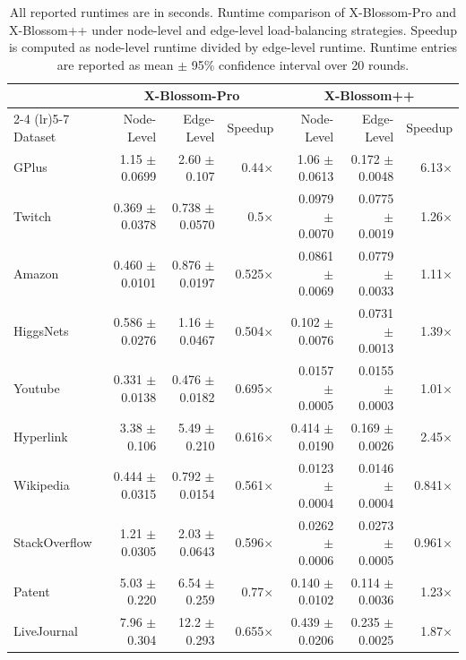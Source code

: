 \begin{table}[H]
 \scriptsize
 \centering
 \setlength{\tabcolsep}{5pt}
 \renewcommand{\arraystretch}{0.88}
 \begin{tabular}{l|rrr|rrr}
 \toprule
  & \multicolumn{3}{c|}{\textbf{X-Blossom-Pro}}
  & \multicolumn{3}{c}{\textbf{X-Blossom++}} \\
 \cmidrule(lr){2-4} \cmidrule(lr){5-7}
 Dataset &
 Node-Level &
 Edge-Level &
 Speedup &
 Node-Level &
 Edge-Level &
 Speedup \\
 \midrule
 GPlus & 1.15 {\tiny $\pm$ 0.0699} & 2.60 {\tiny $\pm$ 0.107} & 0.44$\times$ & 1.06 {\tiny $\pm$ 0.0613} & 0.172 {\tiny $\pm$ 0.0048} & 6.13$\times$ \\
 Twitch & 0.369 {\tiny $\pm$ 0.0378} & 0.738 {\tiny $\pm$ 0.0570} & 0.5$\times$ & 0.0979 {\tiny $\pm$ 0.0070} & 0.0775 {\tiny $\pm$ 0.0019} & 1.26$\times$ \\
 Amazon & 0.460 {\tiny $\pm$ 0.0101} & 0.876 {\tiny $\pm$ 0.0197} & 0.525$\times$ & 0.0861 {\tiny $\pm$ 0.0069} & 0.0779 {\tiny $\pm$ 0.0033} & 1.11$\times$ \\
 HiggsNets & 0.586 {\tiny $\pm$ 0.0276} & 1.16 {\tiny $\pm$ 0.0467} & 0.504$\times$ & 0.102 {\tiny $\pm$ 0.0076} & 0.0731 {\tiny $\pm$ 0.0013} & 1.39$\times$ \\
 Youtube & 0.331 {\tiny $\pm$ 0.0138} & 0.476 {\tiny $\pm$ 0.0182} & 0.695$\times$ & 0.0157 {\tiny $\pm$ 0.0005} & 0.0155 {\tiny $\pm$ 0.0003} & 1.01$\times$ \\
 Hyperlink & 3.38 {\tiny $\pm$ 0.106} & 5.49 {\tiny $\pm$ 0.210} & 0.616$\times$ & 0.414 {\tiny $\pm$ 0.0190} & 0.169 {\tiny $\pm$ 0.0026} & 2.45$\times$ \\
 Wikipedia & 0.444 {\tiny $\pm$ 0.0315} & 0.792 {\tiny $\pm$ 0.0154} & 0.561$\times$ & 0.0123 {\tiny $\pm$ 0.0004} & 0.0146 {\tiny $\pm$ 0.0004} & 0.841$\times$ \\
 StackOverflow & 1.21 {\tiny $\pm$ 0.0305} & 2.03 {\tiny $\pm$ 0.0643} & 0.596$\times$ & 0.0262 {\tiny $\pm$ 0.0006} & 0.0273 {\tiny $\pm$ 0.0005} & 0.961$\times$ \\
 Patent & 5.03 {\tiny $\pm$ 0.220} & 6.54 {\tiny $\pm$ 0.259} & 0.77$\times$ & 0.140 {\tiny $\pm$ 0.0102} & 0.114 {\tiny $\pm$ 0.0036} & 1.23$\times$ \\
 LiveJournal & 7.96 {\tiny $\pm$ 0.304} & 12.2 {\tiny $\pm$ 0.293} & 0.655$\times$ & 0.439 {\tiny $\pm$ 0.0206} & 0.235 {\tiny $\pm$ 0.0025} & 1.87$\times$ \\
 \bottomrule
 \end{tabular}
 \captionsetup{skip=4pt}
 \caption{
 All reported runtimes are in seconds.
 Runtime comparison of X-Blossom-Pro and X-Blossom++ under node-level and edge-level load-balancing strategies.
 Speedup is computed as node-level runtime divided by edge-level runtime.
 Runtime entries are reported as mean $\pm$ 95\% confidence interval over 20 rounds.
 }
 \label{tab:load-balance-ci}
\vspace{-4pt}
\end{table}
